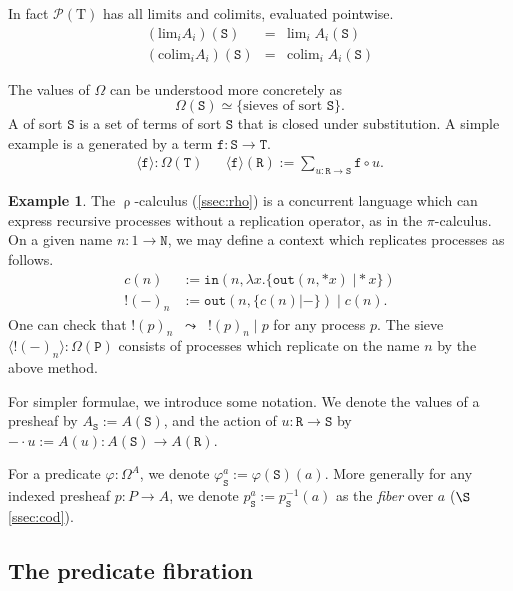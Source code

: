 \documentclass[12pt]{article}
\theoremstyle{definition}
\newtheorem{example}[theorem]{Example}
\newcommand{\define}[1]{{\bf \boldmath{#1}}}
\newcommand{\msc}[1]{\mathscr{#1}}
\newcommand{\mrm}[1]{\mathrm{#1}}
\newcommand{\mtt}[1]{\mathtt{#1}}
\newcommand{\T}{\mrm{T}}
\newcommand{\pow}{\msc{P}}
\newcommand{\ttr}{\mtt{R}}
\newcommand{\tts}{\mtt{S}}
\newcommand{\ttt}{\mtt{T}}
\newcommand{\ttf}{\mtt{f}}
\newcommand{\N}{\mtt{N}}
\newcommand{\PP}{\mtt{P}}
\newcommand{\tto}{\mtt{out}}
\newcommand{\tti}{\mtt{in}}
\begin{document}
        
In fact $\pow(\T)$ has all limits and colimits, evaluated pointwise.
\[\begin{array}{rcl}
    (\mrm{lim}_i A_i)(\tts) & = & \mrm{lim}_i \; A_i(\tts) \\
    (\mrm{colim}_i A_i)(\tts) & = & \mrm{colim}_i \; A_i(\tts)
\end{array}\]

The values of $\Omega$ can be understood more concretely as
\[\Omega(\tts) \simeq \{\text{sieves of sort } \tts\}.\]
A \define{sieve} of sort $\tts$ is a set of terms of sort $\tts$ that is closed under substitution. A simple example is a \define{principal sieve} generated by a term $\ttf:\tts\to\ttt$.
\begin{eqnarray}
\label{eq:sieve}
    \langle \ttf\rangle:\Omega(\ttt) &&
    \langle \ttf\rangle(\ttr):= \sum_{u:\ttr\to\tts}\ttf\circ u.
\end{eqnarray}

\begin{example}
    The $\uprho$-calculus (\ref{ssec:rho}) is a concurrent language which can express recursive processes without a replication operator, as in the $\pi$-calculus. On a given name $n:1\to \N$, we may define a context which replicates processes as follows.
    \[\begin{array}{ll}
    c(n)& := \tti(n, \lambda x.\{\tto(n,\ast x) \; \vert \ast x \} ) \\
    !(-)_n & := \tto(n,\{c(n)\vert -\}) \; \vert \; c(n).
    \end{array}\]
One can check that $!(p)_n \;\; \leadsto \;\; !(p)_n \; \vert \; p$ for any process $p$.
The sieve $\langle!(-)_n\rangle:\Omega(\PP)$ consists of processes which replicate on the name $n$ by the above method.
\end{example}

For simpler formulae, we introduce some notation. We denote the values of a presheaf by $A_\tts := A(\tts)$, and the action of $u:\ttr\to \tts$ by $-\cdot u:= A(u): A(\tts)\to A(\ttr)$.

For a predicate $\varphi:\Omega^A$, we denote $\varphi_\tts^a := \varphi(\tts)(a)$. More generally for any indexed presheaf $p:P\to A$, we denote $p_\tts^a:=p_\tts^{-1}(a)$ as the \textit{fiber} over $a$ ($\S$\ref{ssec:cod}).

\subsection{The predicate fibration}
\label{ssec:sub}
\end{document}
